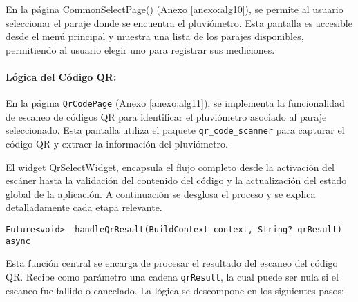 En la página CommonSelectPage() (Anexo \ref{anexo:alg10}), se permite al usuario seleccionar el paraje donde se encuentra el pluviómetro. Esta pantalla es accesible desde el menú principal y muestra una lista de los parajes disponibles, permitiendo al usuario elegir uno para registrar sus mediciones.


\paragraph{Lógica del Código QR:}

En la página \texttt{QrCodePage} (Anexo \ref{anexo:alg11}), se implementa la funcionalidad de escaneo de códigos QR para identificar el pluviómetro asociado al paraje seleccionado. Esta pantalla utiliza el paquete \texttt{qr\_code\_scanner} para capturar el código QR y extraer la información del pluviómetro.



El widget QrSelectWidget, encapsula el flujo completo desde la activación del escáner hasta la validación del contenido del código y la actualización del estado global de la aplicación. A continuación se desglosa el proceso y se explica detalladamente cada etapa relevante.

\begin{verbatim}
Future<void> _handleQrResult(BuildContext context, String? qrResult) async
\end{verbatim}

Esta función central se encarga de procesar el resultado del escaneo del código QR. Recibe como parámetro una cadena \texttt{qrResult}, la cual puede ser nula si el escaneo fue fallido o cancelado. La lógica se descompone en los siguientes pasos:

